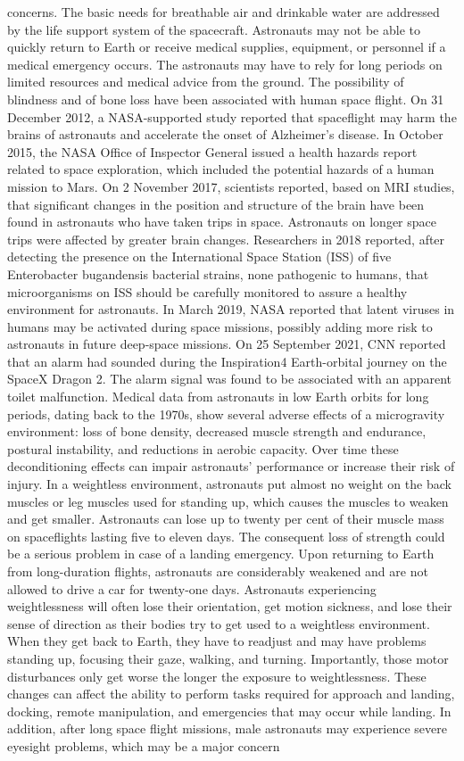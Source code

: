 \documentclass[12pt]{article}
\begin{document}
concerns. The basic needs for breathable air and drinkable water are addressed by the life support system of the spacecraft. Astronauts may not be able to quickly return to Earth or receive medical supplies, equipment, or personnel if a medical emergency occurs. The astronauts may have to rely for long periods on limited resources and medical advice from the ground. The possibility of blindness and of bone loss have been associated with human space flight. On 31 December 2012, a NASA-supported study reported that spaceflight may harm the brains of astronauts and accelerate the onset of Alzheimer's disease. In October 2015, the NASA Office of Inspector General issued a health hazards report related to space exploration, which included the potential hazards of a human mission to Mars. On 2 November 2017, scientists reported, based on MRI studies, that significant changes in the position and structure of the brain have been found in astronauts who have taken trips in space. Astronauts on longer space trips were affected by greater brain changes. Researchers in 2018 reported, after detecting the presence on the International Space Station (ISS) of five Enterobacter bugandensis bacterial strains, none pathogenic to humans, that microorganisms on ISS should be carefully monitored to assure a healthy environment for astronauts. In March 2019, NASA reported that latent viruses in humans may be activated during space missions, possibly adding more risk to astronauts in future deep-space missions. On 25 September 2021, CNN reported that an alarm had sounded during the Inspiration4 Earth-orbital journey on the SpaceX Dragon 2. The alarm signal was found to be associated with an apparent toilet malfunction. Medical data from astronauts in low Earth orbits for long periods, dating back to the 1970s, show several adverse effects of a microgravity environment: loss of bone density, decreased muscle strength and endurance, postural instability, and reductions in aerobic capacity. Over time these deconditioning effects can impair astronauts' performance or increase their risk of injury. In a weightless environment, astronauts put almost no weight on the back muscles or leg muscles used for standing up, which causes the muscles to weaken and get smaller. Astronauts can lose up to twenty per cent of their muscle mass on spaceflights lasting five to eleven days. The consequent loss of strength could be a serious problem in case of a landing emergency. Upon returning to Earth from long-duration flights, astronauts are considerably weakened and are not allowed to drive a car for twenty-one days. Astronauts experiencing weightlessness will often lose their orientation, get motion sickness, and lose their sense of direction as their bodies try to get used to a weightless environment. When they get back to Earth, they have to readjust and may have problems standing up, focusing their gaze, walking, and turning. Importantly, those motor disturbances only get worse the longer the exposure to weightlessness. These changes can affect the ability to perform tasks required for approach and landing, docking, remote manipulation, and emergencies that may occur while landing. In addition, after long space flight missions, male astronauts may experience severe eyesight problems, which may be a major concern 
\end{document}
